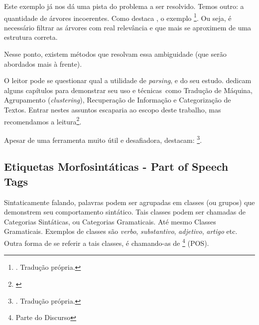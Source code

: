 Este exemplo já nos dá uma pista do problema a ser resolvido. Temos outro: a quantidade de árvores incoerentes. Como destaca , o exemplo 
\footnote{. Tradução própria.}.
Ou seja, é necessário filtrar as árvores com real relevância e que mais se aproximem de uma estrutura correta.

Nesse ponto, existem métodos que resolvam essa ambiguidade (que serão abordados mais à frente).

O leitor pode se questionar qual a utilidade de \textit{parsing}, e do seu estudo.  dedicam alguns capítulos para demonstrar seu uso e técnicas\ como Tradução de Máquina, Agrupamento (\textit{clustering}), Recuperação de Informação e Categorização de Textos. Entrar nestes assuntos escaparia ao escopo deste trabalho, mas recomendamos a leitura\footnote{\cite[capítulos~13,14,15,16]{Manning1999FoundationsNLP}}.

Apesar de uma ferramenta muito útil e desafiadora,  destacam:
\footnote{. Tradução própria.}. 


\subsection{Etiquetas Morfosintáticas - Part of Speech Tags}
\label{subsec:POStags}

Sintaticamente falando, palavras podem ser agrupadas em classes (ou grupos) que demonstrem seu comportamento sintático. Tais classes podem ser chamadas de Categorias Sintáticas, ou Categorias Gramaticais. Até mesmo Classes Gramaticais. Exemplos de classes são \textit{verbo}, \textit{substantivo}, \textit{adjetivo}, \textit{artigo} etc. Outra forma de se referir a tais classes, é chamando-as de \footnote{Parte do Discurso} (POS).

